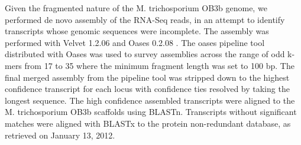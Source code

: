 Given the fragmented nature of the M. trichosporium OB3b genome, we performed de novo assembly of the RNA-Seq reads, in an attempt to identify transcripts whose genomic sequences were incomplete.
The assembly was performed with Velvet 1.2.06 \cite{zerbino2008} and Oases 0.2.08 \cite{schulz2012}.
The oases pipeline tool distributed with Oases was used to survey assemblies across the range of odd k-mers from 17 to 35 where the minimum fragment length was set to 100 bp.
The final merged assembly from the pipeline tool was stripped down to the highest confidence transcript for each locus with confidence ties resolved by taking the longest sequence.
The high confidence assembled transcripts were aligned to the M. trichosporium OB3b scaffolds using BLASTn.
Transcripts without significant matches were aligned with BLASTx to the protein non-redundant database, as retrieved on January 13, 2012.


